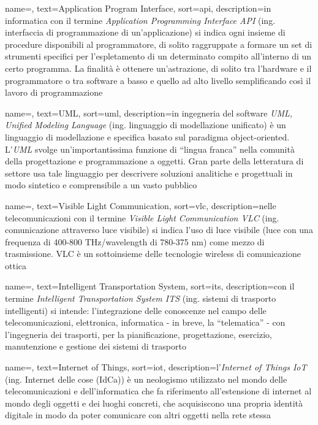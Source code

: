  {
    name=,
    text=Application Program Interface,
    sort=api,
    description={in informatica con il termine \emph{Application Programming Interface API} (ing. interfaccia di programmazione di un'applicazione) si indica ogni insieme di procedure disponibili al programmatore, di solito raggruppate a formare un set di strumenti specifici per l'espletamento di un determinato compito all'interno di un certo programma. La finalità è ottenere un'astrazione, di solito tra l'hardware e il programmatore o tra software a basso e quello ad alto livello semplificando così il lavoro di programmazione}
}

 {
    name=,
    text=UML,
    sort=uml,
    description={in ingegneria del software \emph{UML, Unified Modeling Language} (ing. linguaggio di modellazione unificato) è un linguaggio di modellazione e specifica basato sul paradigma object-oriented. L'\emph{UML} svolge un'importantissima funzione di ``lingua franca'' nella comunità della progettazione e programmazione a oggetti. Gran parte della letteratura di settore usa tale linguaggio per descrivere soluzioni analitiche e progettuali in modo sintetico e comprensibile a un vasto pubblico}
}

 {
    name=,
    text=Visible Light Communication,
    sort=vlc,
    description={nelle telecomunicazioni con il termine \emph{Visible Light Communication VLC} (ing. comunicazione attraverso luce visibile) si indica l'uso di luce visibile (luce con una frequenza di 400-800 THz/wavelength di 780-375 nm) come mezzo di trasmissione. VLC è un sottoinsieme delle tecnologie wireless di comunicazione ottica}
}

 {
    name=,
    text=Intelligent Transportation System,
    sort=its,
    description={con il termine \emph{Intelligent Transportation System ITS} (ing. sistemi di trasporto intelligenti) si intende: l'integrazione delle conoscenze nel campo delle telecomunicazioni, elettronica, informatica - in breve, la “telematica” - con l'ingegneria dei trasporti, per la pianificazione, progettazione, esercizio, manutenzione e gestione dei sistemi di trasporto}
}

 {
    name=,
    text=Internet of Things,
    sort=iot,
    description={l'\emph{Internet of Things IoT} (ing. Internet delle cose (IdCa)) è un neologismo utilizzato nel mondo delle telecomunicazioni e dell'informatica che fa riferimento all'estensione di internet al mondo degli oggetti e dei luoghi concreti, che acquisiscono una propria identità digitale in modo da poter comunicare con altri oggetti nella rete stessa}
}

